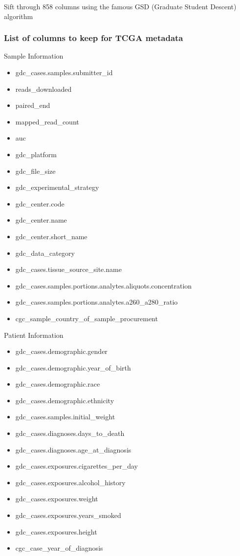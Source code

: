 \documentclass{article}
\providecommand{\tightlist}{%
      \setlength{\itemsep}{0pt}\setlength{\parskip}{0pt}}
\begin{document}
    Sift through 858 columns using the famous GSD (Graduate Student Descent)
algorithm

    \subsubsection{List of columns to keep for TCGA
metadata}\label{list-of-columns-to-keep-for-tcga-metadata}

Sample Information

\begin{itemize}
\tightlist
\item
  gdc\_cases.samples.submitter\_id\\
\item
  reads\_downloaded
\item
  paired\_end
\item
  mapped\_read\_count
\item
  auc
\item
  gdc\_platform
\item
  gdc\_file\_size
\item
  gdc\_experimental\_strategy
\item
  gdc\_center.code
\item
  gdc\_center.name\\
\item
  gdc\_center.short\_name
\item
  gdc\_data\_category
\item
  gdc\_cases.tissue\_source\_site.name
\item
  gdc\_cases.samples.portions.analytes.aliquots.concentration
\item
  gdc\_cases.samples.portions.analytes.a260\_a280\_ratio
\item
  cgc\_sample\_country\_of\_sample\_procurement
\end{itemize}

Patient Information

\begin{itemize}
\tightlist
\item
  gdc\_cases.demographic.gender
\item
  gdc\_cases.demographic.year\_of\_birth
\item
  gdc\_cases.demographic.race
\item
  gdc\_cases.demographic.ethnicity
\item
  gdc\_cases.samples.initial\_weight
\item
  gdc\_cases.diagnoses.days\_to\_death
\item
  gdc\_cases.diagnoses.age\_at\_diagnosis
\item
  gdc\_cases.exposures.cigarettes\_per\_day\\
\item
  gdc\_cases.exposures.alcohol\_history
\item
  gdc\_cases.exposures.weight
\item
  gdc\_cases.exposures.years\_smoked
\item
  gdc\_cases.exposures.height
\item
  cgc\_case\_year\_of\_diagnosis
\end{itemize}
\end{document}
